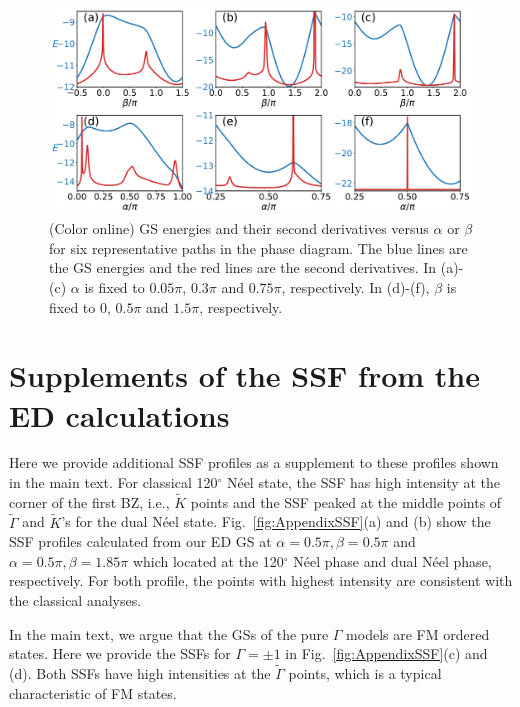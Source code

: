 \documentclass[aps,prb,reprint,amsfonts,amsmath,amssymb,showpacs,groupedaddress,superscriptaddress]{revtex4-1}
\begin{document}
\begin{figure}
    \centering
    \includegraphics[width=\columnwidth]{SecondDerivatives.pdf}
    \caption{\label{fig:SecondDerivatives} (Color online) GS energies and their second derivatives versus $\alpha$ or $\beta$ for six representative paths in the phase diagram. The blue lines are the GS energies and the red lines are the second derivatives. In (a)-(c) $\alpha$ is fixed to $0.05\pi$, $0.3\pi$ and $0.75\pi$, respectively. In (d)-(f), $\beta$ is fixed to $0$, $0.5\pi$ and $1.5\pi$, respectively.}
\end{figure}

\section{\label{apx:SSF}Supplements of the SSF from the ED calculations}

Here we provide additional SSF profiles as a supplement to these profiles shown in the main text. For classical 120$^\circ$ N\'{e}el state, the SSF has high intensity at the corner of the first BZ, i.e., $\tilde{K}$ points and the SSF peaked at the middle points of $\tilde{\Gamma}$ and $\tilde{K}$'s for the dual N\'{e}el state. Fig.~\ref{fig:AppendixSSF}(a) and (b) show the SSF profiles calculated from our ED GS at $\alpha=0.5\pi, \beta=0.5\pi$ and $\alpha=0.5\pi, \beta=1.85\pi$ which located at the 120$^\circ$ N\'{e}el phase and dual N\'{e}el phase, respectively. For both profile, the points with highest intensity are consistent with the classical analyses.

In the main text, we argue that the GSs of the pure $\Gamma$ models are FM ordered states. Here we provide the SSFs for $\Gamma = \pm 1$ in Fig.~\ref{fig:AppendixSSF}(c) and (d). Both SSFs have high intensities at the $\tilde{\Gamma}$ points, which is a typical characteristic of FM states.
\end{document}
